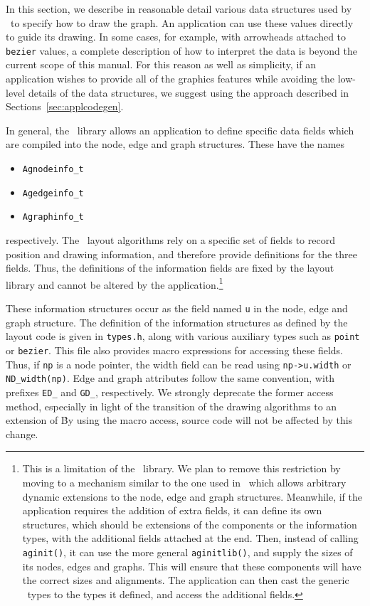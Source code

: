 In this section, we describe in reasonable detail various data structures
used by \gviz\ to specify how to draw the graph. An application can
use these values directly to guide its drawing. In some cases, for example,
with arrowheads attached to {\tt bezier} values, a complete description
of how to interpret the data is beyond the current scope of this manual.
For this reason as well as simplicity, 
if an application wishes to provide all of the
graphics features while avoiding the low-level details of the data
structures, we suggest using the approach described in 
Sections~\ref{sec:applcodegen}.

In general,
the \graph\ library allows an application to define specific data fields 
which are 
compiled into the node, edge and graph structures. These have the names
\begin{itemize}
\item \verb+Agnodeinfo_t+
\item \verb+Agedgeinfo_t+
\item \verb+Agraphinfo_t+
\end{itemize}
respectively. The \gviz\ layout algorithms rely on a specific set of fields
to record position and drawing information, and therefore provide 
definitions for the three fields. Thus, the definitions
of the information fields are fixed by the layout library and
cannot be altered by the application.\footnote{This is a limitation
of the \graph\ library. We plan to remove this restriction by moving to
a mechanism similar to the one used in
\agraph\, which allows arbitrary dynamic extensions to the
node, edge and graph structures. Meanwhile, if the application requires
the addition of extra fields, it can define its own structures, which
should be extensions of the components or the information types, with
the additional fields attached at the end. Then, instead of calling
{\tt aginit()}, it can use the more general {\tt aginitlib()}, and
supply the sizes of its nodes, edges and graphs. This will ensure
that these components will have the correct sizes and alignments. 
The application can then cast the generic \graph\ types to the
types it defined, and access the additional fields.}

These information structures occur as the field named {\tt u} in the
node, edge and graph structure. The definition of the information
structures as defined by the layout code is given in {\tt types.h},
along with various auxiliary types such as {\tt point} or {\tt bezier}.
This file also provides macro expressions for accessing these
fields. Thus, if {\tt np} is a node pointer, the width field can
be read using {\tt np->u.width} or \verb+ND_width(np)+.
Edge and graph attributes follow the same convention, with
prefixes \verb+ED_+ and \verb+GD_+, respectively.
We strongly deprecate the former access method, especially in light of
the transition of the drawing algorithms to an extension of \graph\.
By using the macro access, source code will not be affected by this
change.

